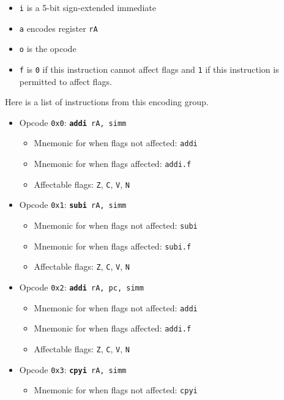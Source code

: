 \documentclass{article}
\begin{document}
	\singlespacing
	\begin{itemize}
		\item \texttt{i} is a 5-bit sign-extended immediate
		\item \texttt{a} encodes register \texttt{rA}
		\item \texttt{o} is the opcode
		\item \texttt{f} is \texttt{0} if this instruction cannot affect
		flags and \texttt{1} if this instruction is permitted to affect
		flags. 
	\end{itemize}
	\doublespacing

	Here is a list of instructions from this encoding group.

	\singlespacing
	\begin{itemize}
		\item Opcode \texttt{0x0}:
			\texttt{\textbf{addi} rA, simm}
		\begin{itemize}
			\item Mnemonic for when flags not affected:  \texttt{addi}
			\item Mnemonic for when flags affected:  \texttt{addi.f}
			\item Affectable flags:
				\texttt{Z}, \texttt{C}, \texttt{V}, \texttt{N}
		\end{itemize}
		\item Opcode \texttt{0x1}:
			\texttt{\textbf{subi} rA, simm}
		\begin{itemize}
			\item Mnemonic for when flags not affected:  \texttt{subi}
			\item Mnemonic for when flags affected:  \texttt{subi.f}
			\item Affectable flags:
				\texttt{Z}, \texttt{C}, \texttt{V}, \texttt{N}
		\end{itemize}
		\item Opcode \texttt{0x2}:
			\texttt{\textbf{addi} rA, pc, simm}
		\begin{itemize}
			\item Mnemonic for when flags not affected:  \texttt{addi}
			\item Mnemonic for when flags affected:  \texttt{addi.f}
			\item Affectable flags:
				\texttt{Z}, \texttt{C}, \texttt{V}, \texttt{N}
		\end{itemize}
		\item Opcode \texttt{0x3}:
			\texttt{\textbf{cpyi} rA, simm}
		\begin{itemize}
			\item Mnemonic for when flags not affected:  \texttt{cpyi}

\end{itemize}
\end{itemize}
\end{document}
